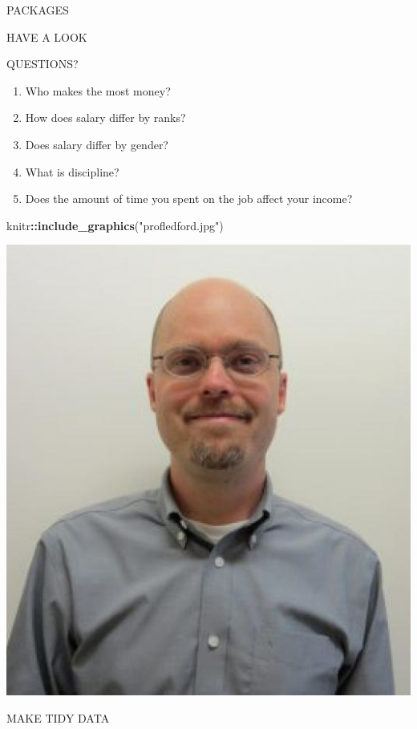 \documentclass[ignorenonframetext,]{beamer}
\newenvironment{Shaded}{\begin{snugshade}}{\end{snugshade}}
\newcommand{\KeywordTok}[1]{\textcolor[rgb]{0.13,0.29,0.53}{\textbf{#1}}}
\newcommand{\DataTypeTok}[1]{\textcolor[rgb]{0.13,0.29,0.53}{#1}}
\newcommand{\StringTok}[1]{\textcolor[rgb]{0.31,0.60,0.02}{#1}}
\newcommand{\OperatorTok}[1]{\textcolor[rgb]{0.81,0.36,0.00}{\textbf{#1}}}
\newcommand{\NormalTok}[1]{#1}
\providecommand{\tightlist}{%
  \setlength{\itemsep}{0pt}\setlength{\parskip}{0pt}}
\begin{document}
\begin{frame}[fragile]{PACKAGES}
\begin{block}{HAVE A LOOK}
\end{block}

\begin{block}{QUESTIONS?}

\begin{enumerate}
\def\labelenumi{\arabic{enumi}.}
\tightlist
\item
  Who makes the most money?
\item
  How does salary differ by ranks?
\item
  Does salary differ by gender?
\item
  What is discipline?
\item
  Does the amount of time you spent on the job affect your income?
\end{enumerate}

\begin{Shaded}
\begin{Highlighting}[]
\NormalTok{knitr}\OperatorTok{::}\KeywordTok{include_graphics}\NormalTok{(}\StringTok{"profledford.jpg"}\NormalTok{)}
\end{Highlighting}
\end{Shaded}

\begin{center}\includegraphics[width=0.3\linewidth]{profledford} \end{center}

\end{block}

\begin{block}{MAKE TIDY DATA}

\begin{Shaded}
\end{Shaded}


\end{block}
\end{frame}
\end{document}
